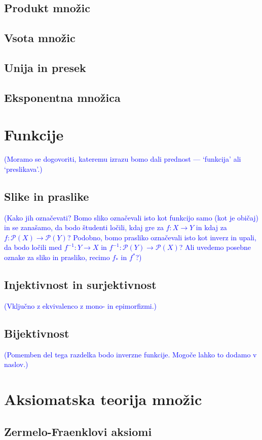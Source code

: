 \documentclass[11pt,a4paper,twoside]{book}
\newcommand{\note}[1]{{\small\textcolor{blue}{(#1)}}}
\newcommand{\pst}{\mathcal{P}}
\begin{document}
		\section{Produkt množic}
		\section{Vsota množic}
		\section{Unija in presek}
		\section{Eksponentna množica}
	
	\chapter{Funkcije}
		\note{Moramo se dogovoriti, kateremu izrazu bomo dali prednost --- `funkcija' ali `preslikava'.}
		\section{Slike in praslike}
			\note{Kako jih označevati? Bomo sliko označevali isto kot funkcijo samo (kot je običaj) in se zanašamo, da bodo študenti ločili, kdaj gre za $f\colon X \to Y$ in kdaj za $f\colon \pst(X) \to \pst(Y)$? Podobno, bomo prasliko označevali isto kot inverz in upali, da bodo ločili med $f^{-1}\colon Y \to X$ in $f^{-1}\colon \pst(Y) \to \pst(X)$? Ali uvedemo posebne oznake za sliko in prasliko, recimo $f_*$ in $f^*$?}
		\section{Injektivnost in surjektivnost}
			\note{Vključno z ekvivalenco z mono- in epimorfizmi.}
		\section{Bijektivnost}
			\note{Pomemben del tega razdelka bodo inverzne funkcije. Mogoče lahko to dodamo v naslov.}
	
	
	
	\chapter{Aksiomatska teorija množic}
		\section{Zermelo-Fraenklovi aksiomi}
\end{document}
